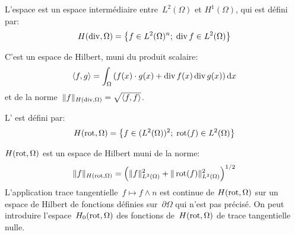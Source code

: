 \begin{definition}
L'espace  est un espace intermédiaire entre~$L^2(\Omega)$ et $H^1(\Omega)$, qui est défini par:
\begin{equation}
H(\operatorname{div},\Omega)=\left\{ f\in L^2(\Omega)^n;\; \operatorname{div} f\in L^2(\Omega)\right\}
\end{equation}
\end{definition}
C'est un espace de Hilbert, muni du produit scalaire:
\begin{equation}
\langle f,g \rangle = \displaystyle\int_\Omega \left( f(x)\cdot g(x)+\operatorname{div} f(x) \operatorname{div} g(x) \right) \text{d} x
\end{equation}
et de la norme~$\|f\|_{H(\operatorname{div},\Omega)}=\sqrt{\langle f,f\rangle}$.
\medskipvm
{}

\medskip
\begin{definition}
L' est défini par:
\begin{equation}
H(\operatorname{rot},\Omega) = \left\{ f\in (L^2(\Omega))^2;\; \operatorname{rot}(f) \in L^2(\Omega)\right\}
\end{equation}
\end{definition}
$H(\operatorname{rot},\Omega)$ est un espace de Hilbert muni de la norme:
\begin{equation}
\|f\|_{H(\operatorname{rot},\Omega)} = \left( \|f\|^2_{L^2(\Omega)} + \|\operatorname{rot}(f)\|^2_{L^2(\Omega)}\right)^{1/2}
\end{equation}
L'application trace tangentielle~$f \mapsto f \wedge n$ est continue de $H(\operatorname{rot},\Omega)$ sur un espace de Hilbert de fonctions définies sur~$\partial\Omega$ qui n'est pas précisé. On peut introduire l'espace~$H_0(\operatorname{rot},\Omega)$ des fonctions de~$H(\operatorname{rot},\Omega)$ de trace tangentielle nulle.
\medskipvm
{}


